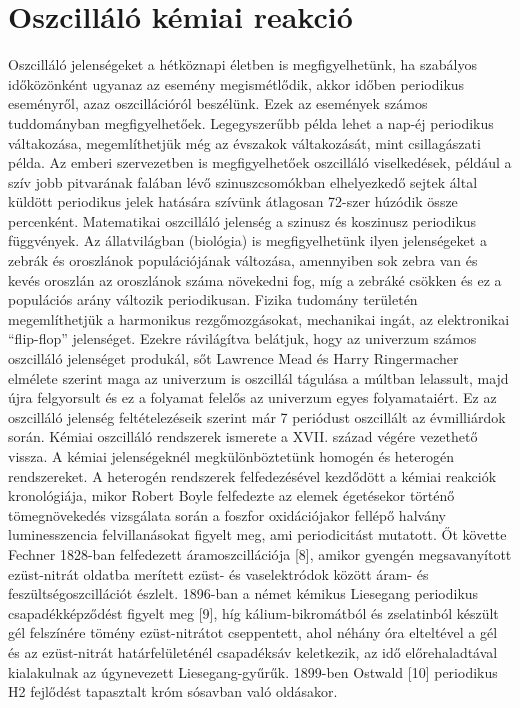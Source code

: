\section{Oszcilláló kémiai reakció}
Oszcilláló jelenségeket a hétköznapi életben is megfigyelhetünk, ha szabályos időközönként ugyanaz az esemény megismétlődik, akkor időben periodikus eseményről, azaz oszcillációról beszélünk. Ezek az események számos tuddományban megfigyelhetőek. Legegyszerűbb példa lehet a nap-éj periodikus váltakozása, megemlíthetjük még az évszakok váltakozását, mint csillagászati példa.
Az emberi szervezetben is megfigyelhetőek oszcilláló viselkedések, például a szív jobb pitvarának falában lévő szinuszcsomókban elhelyezkedő sejtek által küldött periodikus jelek hatására  szívünk átlagosan 72-szer húzódik össze percenként. Matematikai oszcilláló jelenség a szinusz és koszinusz periodikus függvények. Az állatvilágban (biológia) is megfigyelhetünk ilyen jelenségeket a zebrák és oroszlánok populációjának változása, amennyiben sok zebra van és kevés oroszlán az oroszlánok száma növekedni fog, míg a zebráké csökken és ez a populációs arány változik periodikusan. Fizika tudomány területén megemlíthetjük a harmonikus rezgőmozgásokat, mechanikai ingát,  az elektronikai “flip-flop” jelenséget. Ezekre rávilágítva belátjuk, hogy az univerzum számos oszcilláló jelenséget produkál, sőt Lawrence Mead és Harry Ringermacher elmélete \cite{ringermacher2017strong}  szerint maga az univerzum is oszcillál tágulása a múltban lelassult, majd újra felgyorsult és ez a folyamat felelős az univerzum egyes folyamataiért. Ez az oszcilláló jelenség feltételezéseik szerint már 7 periódust oszcillált az évmilliárdok során.
Kémiai oszcilláló rendszerek ismerete a XVII. század végére vezethető vissza. 
A kémiai jelenségeknél megkülönböztetünk homogén és heterogén rendszereket. A heterogén rendszerek felfedezésével kezdődött a kémiai reakciók kronológiája, mikor Robert Boyle \cite{harvey1957history} felfedezte az elemek égetésekor történő tömegnövekedés vizsgálata során a foszfor oxidációjakor fellépő halvány luminesszencia felvillanásokat figyelt meg, ami periodicitást mutatott. Őt követte  Fechner 1828-ban felfedezett áramoszcillációja [8], amikor gyengén megsavanyított ezüst-nitrát oldatba merített ezüst- és vaselektródok között áram- és feszültségoszcillációt észlelt. 1896-ban a német kémikus Liesegang periodikus csapadékképződést figyelt meg [9], híg kálium-bikromátból és zselatinból készült gél felszínére tömény ezüst-nitrátot cseppentett, ahol néhány óra elteltével a gél és az ezüst-nitrát határfelületénél csapadéksáv keletkezik, az idő előrehaladtával kialakulnak az úgynevezett Liesegang-gyűrűk. 1899-ben Ostwald [10] periodikus H2 fejlődést tapasztalt króm sósavban való oldásakor.
